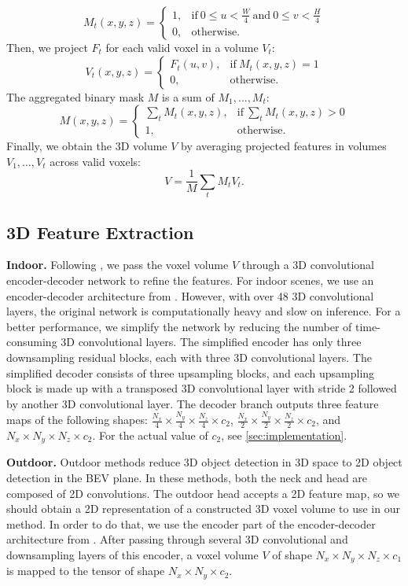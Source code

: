 \documentclass[10pt,twocolumn,letterpaper]{article}
\begin{document}
\[M_t(x, y, z) = \begin{cases}
    1, & \text{if}\ 0 \le u < \frac{W}{4}\ \text{and}\ 0 \le v < \frac{H}{4} \\
    0, & \text{otherwise}.
\end{cases}\]
Then, we project $F_t$ for each valid voxel in a volume $V_t$:
\[V_t(x, y, z) = \begin{cases}
    F_t(u, v), & \text{if}\ M_t(x, y, z) = 1 \\
    0, & \text{otherwise}.
\end{cases}\]
The aggregated binary mask $M$ is a sum of $M_1, \dots, M_t$:
\[M(x, y, z) = \begin{cases}
    \sum_t M_t(x, y, z), & \text{if}\ \sum_t M_t(x, y, z) > 0 \\
    1, & \text{otherwise}.
\end{cases}\]
Finally, we obtain the 3D volume $V$ by averaging projected features in volumes $V_1, \dots, V_t$ across valid voxels:
\[V = \frac{1}{M} \sum_t M_t V_t.\]

\subsection{3D Feature Extraction} \label{sec:features}

\textbf{Indoor.} Following \cite{murez2020atlas, hou20193dsis}, we pass the voxel volume $V$ through a 3D convolutional encoder-decoder network to refine the features. For indoor scenes, we use an encoder-decoder architecture from \cite{murez2020atlas}. However, with over 48 3D convolutional layers, the original network is computationally heavy and slow on inference. For a better performance, we simplify the network by reducing the number of time-consuming 3D convolutional layers. The simplified encoder has only three downsampling residual blocks, each with three 3D convolutional layers. The simplified decoder consists of three upsampling blocks, and each upsampling block is made up with a transposed 3D convolutional layer with stride 2 followed by another 3D convolutional layer. The decoder branch outputs three feature maps of the following shapes: $\frac{N_x}{4} \times \frac{N_y}{4} \times \frac{N_z}{4} \times c_2$, $\frac{N_x}{2} \times \frac{N_y}{2} \times \frac{N_z}{2} \times c_2$, and $N_x \times N_y \times N_z \times c_2$. For the actual value of $c_2$, see \ref{sec:implementation}.

\textbf{Outdoor.} Outdoor methods \cite{sindagi2019mvxnet, lang2019pointpillars, yan2018second} reduce 3D object detection in 3D space to 2D object detection in the BEV plane. In these methods, both the neck and head are composed of 2D convolutions. The outdoor head accepts a 2D feature map, so we should obtain a 2D representation of a constructed 3D voxel volume to use in our method. In order to do that, we use the encoder part of the encoder-decoder architecture from \cite{murez2020atlas}. After passing through several 3D convolutional and downsampling layers of this encoder, a voxel volume $V$ of shape $N_x \times N_y \times N_z \times c_1$ is mapped to the tensor of shape $N_x \times N_y \times c_2$.
\end{document}
